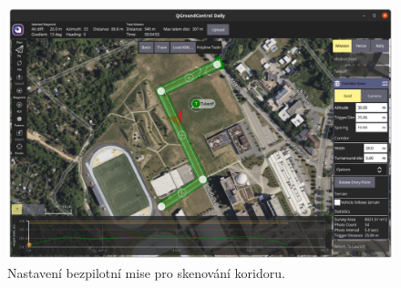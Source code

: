 \begin{figure}[!ht]
    \begin{center}
        \includegraphics[scale=0.34]{obrazky/QGC4}
    \end{center}
    \caption[Nastavení bezpilotní mise pro skenování koridoru]{Nastavení bezpilotní mise pro skenování koridoru.}
    \label{fig:QGC4}
\end{figure}

